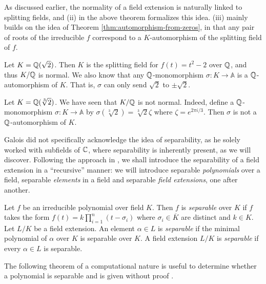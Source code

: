 As discussed earlier, the normality of a field extension is naturally linked to splitting fields, and (ii) in the above theorem formalizes this idea. (iii) mainly builds on the idea of Theorem \ref{thm:automorphism-from-zeros}, in that any pair of roots of the irreducible $f$ correspond to a $K$-automorphism of the splitting field of $f$. 

\begin{example}
	Let $K = \mathbb Q (\sqrt 2)$. Then $K$ is the splitting field for $f(t) = t^2 - 2$ over $\mathbb Q$, and thus $K/ \mathbb Q$ is normal. We also know that any $\mathbb Q$-monomorphism $\sigma: K \to \mathbb A$ is a $\mathbb Q$-automorphism of $K$. That is, $\sigma$ can only send $\sqrt 2$ to $\pm \sqrt 2$. 
\end{example}

\begin{example}
	Let $K = \mathbb Q(\sqrt[3]{2})$. We have seen that $K / \mathbb Q$ is not normal. Indeed, define a $\mathbb Q$-monomorphism $\sigma : K \to \mathbb A$ by $\sigma(\sqrt[3]{2}) =  \sqrt[3]{2}\zeta $ where $\zeta = e^{2 \pi i / 3}$. Then $\sigma$ is not a $\mathbb Q$-automorphism of $K$. 
\end{example}



Galois did not specifically acknowledge the idea of separability, as he solely worked with subfields of $\mathbb C$, where separability is inherently present, as we will discover. Following the approach in \cite{Stewart}, we shall introduce the separability of a field extension in a ``recursive'' manner: we will introduce separable \textit{polynomials} over a field, separable \textit{elements} in a field and separable \textit{field extensions}, one after another. 

\begin{definition}
    Let $f$ be an irreducible polynomial over field $K$. Then $f$ is \textit{separable} over $K$ if $f$ takes the form 
    $
        f(t) = k \prod_{i = 1} ^ n(t - \sigma_i)
    $
    where $\sigma_i \in \overline K$ are distinct and $k \in K$.
    Let $L/K$ be a field extension. An element $\alpha \in L$ is \textit{separable} if the minimal polynomial of $\alpha$ over $K$ is separable over $K$.
    A field extension $L / K$ is \textit{separable} if every $\alpha \in L$ is separable.
\end{definition}

The following theorem of a computational nature is useful to determine whether a polynomial is separable and is given without proof \cite{Stewart}. 

